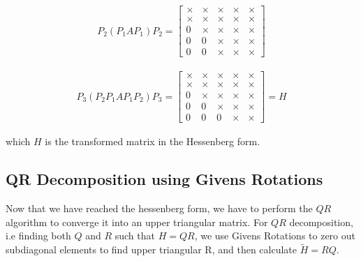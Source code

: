 \documentclass[12pt]{article}
\newcommand{\brak}[1]{\ensuremath{\left(#1\right)}}
\begin{document}
\begin{align}
P_2 \brak{P_1 A P_1} P_2 = \begin{bmatrix}
\times & \times & \times & \times & \times\\
\times & \times & \times & \times & \times\\
0 & \times & \times & \times & \times\\
0 & 0 & \times & \times & \times\\
0 & 0 & \times & \times & \times
\end{bmatrix}
\end{align}

\begin{align}
P_3 \brak{P_2 P_1 A P_1 P_2} P_3 = \begin{bmatrix}
\times & \times & \times & \times & \times\\
\times & \times & \times & \times & \times\\
0 & \times & \times & \times & \times\\
0 & 0 & \times & \times & \times\\
0 & 0 & 0 & \times & \times
\end{bmatrix} = H
\end{align}

which $H$ is the transformed matrix in the Hessenberg form.


\subsection{QR Decomposition using Givens Rotations}
Now that we have reached the hessenberg form, we have to perform the $QR$ algorithm to converge it into an upper triangular matrix.
For $QR$ decomposition, i.e finding both $Q$ and $R$ such that $H = QR$, we use Givens Rotations to zero out subdiagonal elements to find upper triangular R, and then calculate $\tilde{H} = RQ$.
\end{document}
